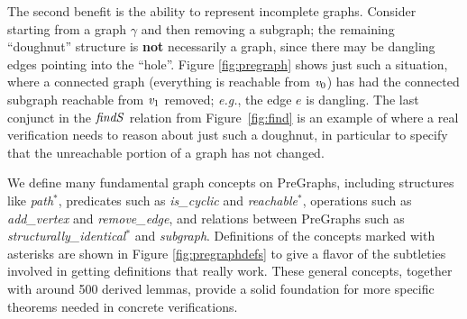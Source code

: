 The second benefit is the ability to represent incomplete graphs.
Consider starting from a graph $\gamma$ and then removing a subgraph; the remaining
``doughnut'' structure is \textbf{not} necessarily a graph, since there may be dangling
edges pointing into the ``hole''.  Figure \ref{fig:pregraph} shows just such a situation,
where a connected graph (everything is reachable from $\mathit{v}_0$) has had the connected
subgraph reachable from $\mathit{v}_1$ removed; \emph{e.g.}, the edge $e$ is dangling.
The last conjunct in the $\mathit{findS}$ relation from Figure~\ref{fig:find} is an example
of where a real verification needs to reason about just such a doughnut, in particular
to specify that the unreachable portion of a graph has not changed.


We define many fundamental graph concepts on PreGraphs,
including structures like \emph{path}$^{*}$, predicates
such as \emph{is\_cyclic} and \emph{reachable}$^{*}$,
operations such as \emph{add\_vertex}
and \emph{remove\_edge}, and relations between PreGraphs such
as \emph{structurally\_identical}$^{*}$ and \emph{subgraph}.
Definitions of the concepts marked with asterisks are
shown in Figure \ref{fig:pregraphdefs} to give a flavor
of the subtleties involved in getting definitions that
really work.
These general concepts, together with around 500 derived lemmas,
provide a
solid foundation for more specific theorems needed in concrete
verifications.

